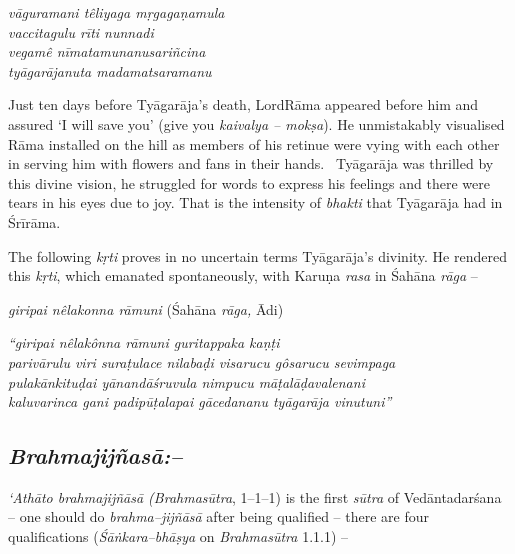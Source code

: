 \begin{myquote}
\textit{vāguramani têliyaga mṛgagaṇamula}\\\textit{vaccitagulu rīti nunnadi}\\\textit{vegamê nīmatamunanusariñcina}\\\textit{tyāgarājanuta madamatsaramanu}
\end{myquote}

Just ten days before Tyāgarāja’s death, LordRāma appeared before him and assured ‘I will save you’ (give you \textit{kaivalya – mokṣa}). He unmistakably visualised Rāma installed on the hill as members of his retinue were vying with each other in serving him with flowers and fans in their hands.  Tyāgarāja was thrilled by this divine vision, he struggled for words to express his feelings and there were tears in his eyes due to joy. That is the intensity of \textit{bhakti} that Tyāgarāja had in Śrīrāma.

The following \textit{kṛti} proves in no uncertain terms Tyāgarāja’s divinity. He rendered this \textit{kṛti}, which emanated spontaneously, with Karuṇa \textit{rasa} in Śahāna \textit{rāga} –

\begin{myquote}
\textit{giripai nêlakonna rāmuni} (Śahāna \textit{rāga,} Ādi)
\end{myquote}

\begin{myquote}
\textit{“giripai nêlakônna rāmuni guritappaka kaṇṭi} \\\textit{parivārulu viri suraṭulace nilabaḍi visarucu gôsarucu sevimpaga}\\\textit{pulakānkituḍai yānandāśruvula nimpucu māṭalāḍavalenani}\\\textit{kaluvarinca gani padipūṭalapai gācedananu tyāgarāja vinutuni”}
\end{myquote}


\subsection*{\textit{Brahmajijñasā:–}}

\textit{‘Athāto brahmajijñāsā (Brahmasūtra}, 1–1–1) is the first \textit{sūtra} of Vedāntadarśana – one should do \textit{brahma–jijñāsā} after being qualified – there are four qualifications (\textit{Śāṅkara–bhāṣya} on \textit{Brahmasūtra} 1.1.1) –

